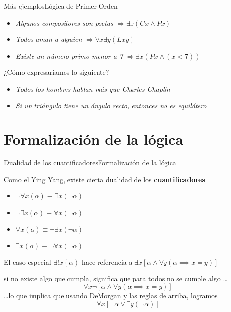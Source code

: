 \documentclass[spanish, c]{beamer}
\begin{document}
\begin{frame}{Más ejemplos}{Lógica de Primer Orden}
    \begin{itemize}[<+->]
        \item \textit{Algunos compositores son poetas} $\Rightarrow \exists x (Cx \wedge Px)$
        \item \textit{Todos aman a alguien} $\Rightarrow \forall x \exists y (Lxy)$
        \item \textit{Existe un número primo menor a 7} $\Rightarrow \exists x(Px \wedge (x < 7))$
    \end{itemize} \pause

    \bigskip

    ¿Cómo expresaríamos lo siguiente? \pause

    \bigskip
    
    \begin{itemize}
        \item \textit{Todos los hombres hablan más que Charles Chaplin} \pause
        \item \textit{Si un triángulo tiene un ángulo recto, entonces no es equilátero}
    \end{itemize}    
\end{frame}

\section{Formalización de la lógica}

\begin{frame}{Dualidad de los cuantificadores}{Formalización de la lógica}

    Como el Ying Yang, existe cierta \alert{dualidad} de los \textbf{cuantificadores} \pause
    \bigskip
    \begin{itemize}[<+->]
        \item $\neg \forall x(\alpha) \equiv \exists x(\neg \alpha)$
        \item $\neg \exists x(\alpha) \equiv \forall x(\neg \alpha)$
        \item $\forall x(\alpha) \equiv \neg \exists x(\neg \alpha)$
        \item $\exists x(\alpha) \equiv \neg \forall x(\neg \alpha)$
    \end{itemize} \pause

    El caso especial $\exists! x(\alpha)$ hace referencia a $\exists x[\alpha \wedge \forall y(\alpha \implies x=y)]$ \pause

    si no existe algo que cumpla, significa que para todos no se cumple algo \dots
    $$\forall x\neg[\alpha \wedge \forall y(\alpha \implies x=y)]$$ \pause
    \dots lo que implica que usando DeMorgan y las reglas de arriba, logramos
    $$\forall x [\neg \alpha \vee \exists y(\neg \alpha)]$$

\end{frame}
\end{document}
